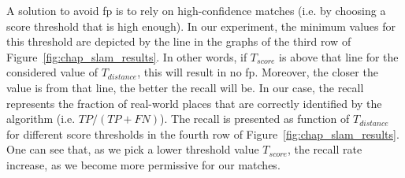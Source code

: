 A solution to avoid \gls*{fp} is to rely on high-confidence matches (i.e. by choosing a score threshold that is high enough). In our experiment, the minimum values for this threshold are depicted by the line in the graphs of the third row of Figure~\ref{fig:chap_slam_results}. In other words, if $T_{score}$ is above that line for the considered value of $T_{distance}$, this will result in no \gls*{fp}. Moreover, the closer the value is from that line, the better the recall will be. In our case, the recall represents the fraction of real-world places that are correctly identified by the algorithm (i.e. $TP/(TP+FN)$). The recall is presented as function of $T_{distance}$ for different score thresholds in the fourth row of Figure~\ref{fig:chap_slam_results}. One can see that, as we pick a lower threshold value $T_{score}$, the recall rate increase, as we become more permissive for our matches. 

